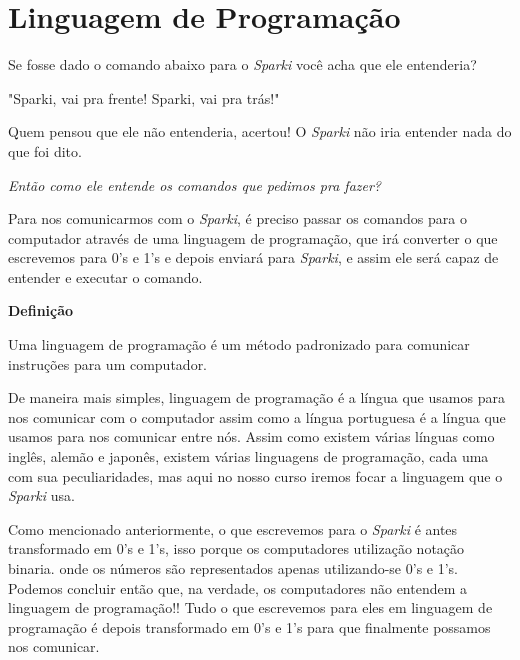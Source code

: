 \documentclass[conference]{IEEEtran}
\begin{document}
\section{\textbf{Linguagem de Programação}}
    Se fosse dado o comando abaixo para o \textit{Sparki} você acha que ele entenderia?
    \begin{center}
    "Sparki, vai pra frente! Sparki, vai pra trás!"
    \end{center}
    \par
    Quem pensou que ele não entenderia, acertou! O \textit{Sparki} não iria entender nada do que foi dito.
    \par
    \textit{Então como ele entende os comandos que pedimos pra fazer?}
    \par
    Para nos comunicarmos com o \textit{Sparki}, é preciso passar os comandos para o computador através de uma linguagem de programação, que irá converter o que escrevemos para 0's e 1's e depois enviará para \textit{Sparki}, e assim ele será capaz de entender e executar o comando.
    \begin{center}
        \textbf{Definição}
    \end{center}
    \par
    Uma linguagem de programação é um método padronizado para comunicar instruções para um computador.
    \par
    De maneira mais simples, linguagem de programação é a língua que usamos para nos comunicar com o computador assim como a língua portuguesa é a língua que usamos para nos comunicar entre nós. Assim como existem várias línguas como inglês, alemão e japonês, existem várias linguagens de programação, cada uma com sua peculiaridades, mas aqui no nosso curso iremos focar a linguagem que o \textit{Sparki} usa.
    \par
    Como mencionado anteriormente, o que escrevemos para o \textit{Sparki} é antes transformado em 0's e 1's, isso porque os computadores utilização notação binaria. onde os números são representados apenas utilizando-se 0's e 1's. Podemos concluir então que, na verdade, os computadores não entendem a linguagem de programação!! Tudo o que escrevemos para eles em linguagem de programação é depois transformado em 0's e 1's para que finalmente possamos nos comunicar.
\end{document}
